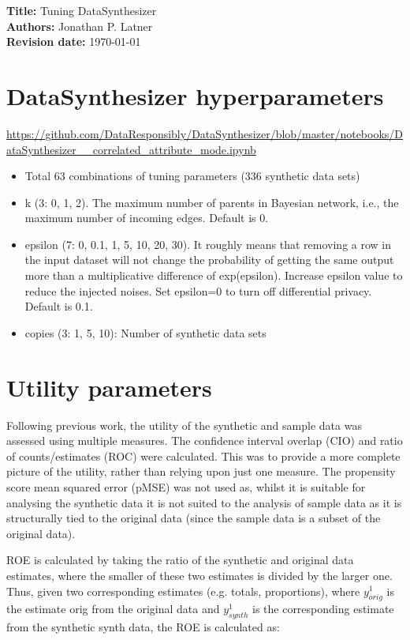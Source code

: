 \documentclass[12pt]{article}
\begin{document}
{\bf Title:} Tuning DataSynthesizer \\
{\bf Authors:} Jonathan P. Latner \\
{\bf Revision date:} \today

\section{DataSynthesizer hyperparameters}

\url{https://github.com/DataResponsibly/DataSynthesizer/blob/master/notebooks/DataSynthesizer__correlated_attribute_mode.ipynb}


\begin{itemize}
    \item Total 63 combinations of tuning parameters (336 synthetic data sets)
    \item k (3: 0, 1, 2).  The maximum number of parents in Bayesian network, i.e., the maximum number of incoming edges.  Default is 0.
    \item epsilon (7: 0, 0.1, 1, 5, 10, 20, 30).  It roughly means that removing a row in the input dataset will not change the probability of getting the same output more than a multiplicative difference of exp(epsilon).  Increase epsilon value to reduce the injected noises. Set epsilon=0 to turn off differential privacy.  Default is 0.1.
    \item copies (3: 1, 5, 10): Number of synthetic data sets
\end{itemize}

\section{Utility parameters}

Following previous work, the utility of the synthetic and sample data was assessed using multiple measures. The confidence interval overlap (CIO) and ratio of counts/estimates (ROC) were calculated. This was to provide a more complete picture of the utility, rather than relying upon just one measure. The propensity score mean squared error (pMSE) was not used as, whilst it is suitable for analysing the synthetic data it is not suited to the analysis of sample data as it is structurally tied to the original data (since the sample data is a subset of the original data).

ROE is calculated by taking the ratio of the synthetic and original data estimates, where the smaller of these two estimates is divided by the larger one. Thus, given two corresponding estimates (e.g. totals, proportions), where $y^1_{orig}$ is the estimate orig from the original data and $y^1_{synth}$ is the corresponding estimate from the synthetic synth data, the ROE is calculated as:
\end{document}
